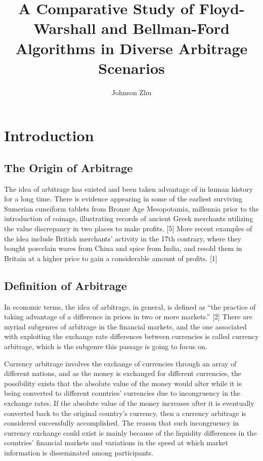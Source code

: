 \documentclass[12pt]{article}
\title{\textbf{A Comparative Study of Floyd-Warshall and Bellman-Ford Algorithms in Diverse Arbitrage Scenarios}}
\author{Johnson Zhu}
\date{} %
\begin{document}
\maketitle

\boldmath %
\unboldmath %

\section{Introduction}
\subsection{The Origin of Arbitrage}
The idea of arbitrage has existed and been taken advantage of in human history for a long time. There is evidence appearing in some of the earliest surviving Sumerian cuneiform tablets from Bronze Age Mesopotamia, millennia prior to the introduction of coinage, illustrating records of ancient Greek merchants utilizing the value discrepancy in two places to make profits. [5] More recent examples of the idea include British merchants’ activity in the 17th contrary, where they bought porcelain wares from China and spice from India, and resold them in Britain at a higher price to gain a considerable amount of profits. [1]


\subsection{Definition of Arbitrage}

In economic terms, the idea of arbitrage, in general, is defined as “the practice of taking advantage of a difference in prices in two or more markets.” [2] There are myriad subgenres of arbitrage in the financial markets, and the one associated with exploiting the exchange rate differences between currencies is called currency arbitrage, which is the subgenre this passage is going to focus on. 

 \hspace*{\fill} %

Currency arbitrage involves the exchange of currencies through an array of different nations, and as the money is exchanged for different currencies, the possibility exists that the absolute value of the money would alter while it is being converted to different countries’ currencies due to incongruency in the exchange rates. If the absolute value of the money increases after it is eventually converted back to the original country’s currency, then a currency arbitrage is considered successfully accomplished. The reason that such incongruency in currency exchange could exist is mainly because of the liquidity differences in the countries’ financial markets and variations in the speed at which market information is disseminated among participants.
\end{document}
